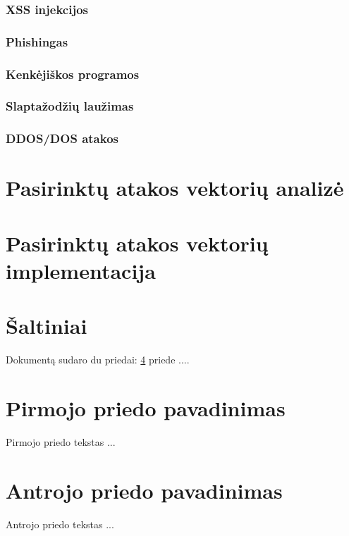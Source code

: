 \documentclass[a4paper,12pt,fleqn]{article}
\begin{document}
\subsubsection{XSS injekcijos}
\subsubsection{Phishingas}
\subsubsection{Kenkėjiškos programos}

\subsubsection{Slaptažodžių laužimas}
\subsubsection{DDOS/DOS atakos}
\section{Pasirinktų atakos vektorių analizė}

\section{Pasirinktų atakos vektorių implementacija}


\section{Šaltiniai}






\newpage
\begin{appendices}
Dokumentą sudaro du priedai: \ref{app:a} priede  ....
\newpage
\section{Pirmojo priedo pavadinimas}
\label{app:a}
Pirmojo priedo tekstas ...

\newpage
\section{Antrojo priedo pavadinimas}
Antrojo priedo tekstas ...

\end{appendices}
\end{document}
